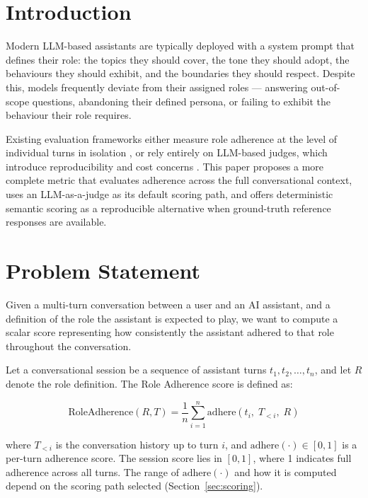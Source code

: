 \documentclass[11pt,a4paper]{article}
\begin{document}
\section{Introduction}

Modern LLM-based assistants are typically deployed with a system prompt that
defines their role: the topics they should cover, the tone they should adopt,
the behaviours they should exhibit, and the boundaries they should respect.
Despite this, models frequently deviate from their assigned roles --- answering
out-of-scope questions, abandoning their defined persona, or failing to exhibit
the behaviour their role requires.

Existing evaluation frameworks either measure role adherence at the level of
individual turns in isolation \citep{zheng2023judging}, or rely entirely on
LLM-based judges, which introduce reproducibility and cost concerns
\citep{deriu2021survey}. This paper proposes a more complete metric that evaluates adherence across
the full conversational context, uses an LLM-as-a-judge as its default
scoring path, and offers deterministic semantic scoring as a reproducible
alternative when ground-truth reference responses are available.

\section{Problem Statement}

Given a multi-turn conversation between a user and an AI assistant, and a
definition of the role the assistant is expected to play, we want to compute a
scalar score representing how consistently the assistant adhered to that role
throughout the conversation.

Let a conversational session be a sequence of assistant turns
$t_1, t_2, \ldots, t_n$, and let $R$ denote the role definition. The Role
Adherence score is defined as:

\begin{equation}
  \text{RoleAdherence}(R, T) = \frac{1}{n} \sum_{i=1}^{n}
  \text{adhere}(t_i,\; T_{<i},\; R)
  \label{eq:score}
\end{equation}

where $T_{<i}$ is the conversation history up to turn $i$, and
$\text{adhere}(\cdot) \in [0, 1]$ is a per-turn adherence score. The
session score lies in $[0, 1]$, where 1 indicates full adherence across
all turns. The range of $\text{adhere}(\cdot)$ and how it is computed
depend on the scoring path selected (Section~\ref{sec:scoring}).
\end{document}
